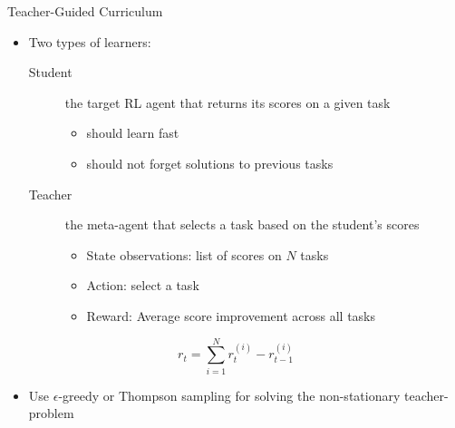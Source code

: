 \begin{frame}[c]{Teacher-Guided Curriculum }
	
	\begin{itemize}
		\item Two types of learners:
		\begin{description}
			\item[Student] the target RL agent that returns its scores on a given task
			\begin{itemize}
				\item should learn fast
				\item should not forget solutions to previous tasks
			\end{itemize}
			\item[Teacher] the meta-agent that selects a task based on the student's scores
			\begin{itemize}
				\item State observations: list of scores on $N$ tasks
				\item Action: select a task
				\item Reward: Average score improvement across all tasks
			\end{itemize}
		\end{description}
	\end{itemize}

	$$r_t = \sum_{i=1}^N r_t^{(i)} - r_{t-1}^{(i)}$$	
	
	\pause
	\begin{itemize}
		\item Use $\epsilon$-greedy or Thompson sampling for solving the non-stationary teacher-problem
	\end{itemize}
	
\end{frame}

